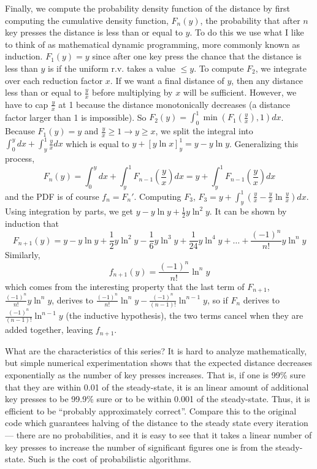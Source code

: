 \documentclass[11pt, oneside]{article}
\begin{document}
Finally, we compute the probability density function of the distance by first
computing the cumulative density function, \( F_n(y) \), the probability that
after \( n \) key presses the distance is less than or equal to \( y \). To
do this we use what I like to think of as mathematical dynamic programming,
more commonly known as induction. \( F_1(y) = y \) since after one key press
the chance that the distance is less than \( y \) is if the uniform r.v. takes
a value \( \leq y \). To compute \( F_2 \), we integrate over each reduction
factor \( x \). If we want a final distance of \( y \), then any distance
less than or equal to \( \frac{y}{x} \) before multiplying by \( x \) will be
sufficient. However, we have to cap \( \frac{y}{x} \) at 1 because the distance
monotonically decreases (a distance factor larger than 1 is impossible). So
\( F_2(y) = \int^1_0 \min(F_1(\frac{y}{x}), 1) dx \). Because \( F_1(y) = y \)
and \( \frac{y}{x} \geq 1 \rightarrow y \geq x \), we split the integral into
\( \int^y_0 dx + \int^1_y \frac{y}{x} dx \) which is equal to
\( y + [y \ln x]^1_y = y - y \ln y \). Generalizing this process,
\[ F_n(y) = \int^y_0 dx + \int^1_y F_{n - 1}(\frac{y}{x}) dx 
          = y + \int^1_y F_{n - 1}(\frac{y}{x}) dx \]
and the PDF is of course \( f_n = F_n' \). Computing \( F_3 \), 
\( F_3 = y + \int^1_y (\frac{y}{x} - \frac{y}{x} \ln \frac{y}{x}) dx \).
Using integration by parts, we get \( y - y \ln y + \frac{1}{2} y \ln^2 y \).
It can be shown by induction that
\[ F_{n + 1}(y) = y - y \ln y + \frac{1}{2} y \ln^2 y - \frac{1}{6} y \ln^3 y
+ \frac{1}{24} y \ln^4 y + \dots + \frac{(-1)^n}{n!} y \ln^n y \]
Similarly, 
\[ f_{n + 1}(y) = \frac{(-1)^n}{n!} \ln^n y \] 
which comes from the interesting property that the last term of \( F_{n + 1} \),
\( \frac{(-1)^n}{n!} y \ln^n y \), derives to
\( \frac{(-1)^n}{n!} \ln^n y - \frac{(-1)^n}{(n - 1)!} \ln^{n - 1} y \), so if
\( F_{n} \) derives to \( \frac{(-1)^n}{(n - 1)!} \ln^{n - 1} y \)
(the inductive hypothesis), the two terms cancel when
they are added together, leaving \( f_{n + 1} \).

What are the characteristics of this series? It is hard to analyze
mathematically, but simple numerical experimentation shows that the expected 
distance decreases exponentially as the number of key presses increases.
That is, if one is  99\% sure that they are within 0.01 of the steady-state,
it is an linear amount of additional key presses to be 99.9\% sure or to be
within 0.001 of the steady-state. Thus, it is efficient to be \enquote{probably 
approximately correct}. Compare this to the original code which guarantees
halving of the distance to the steady state every iteration --- there are no
probabilities, and it is easy to see that it takes a linear number of key
presses to increase the number of significant figures one is from the
steady-state. Such is the cost of probabilistic algorithms.
\end{document}
